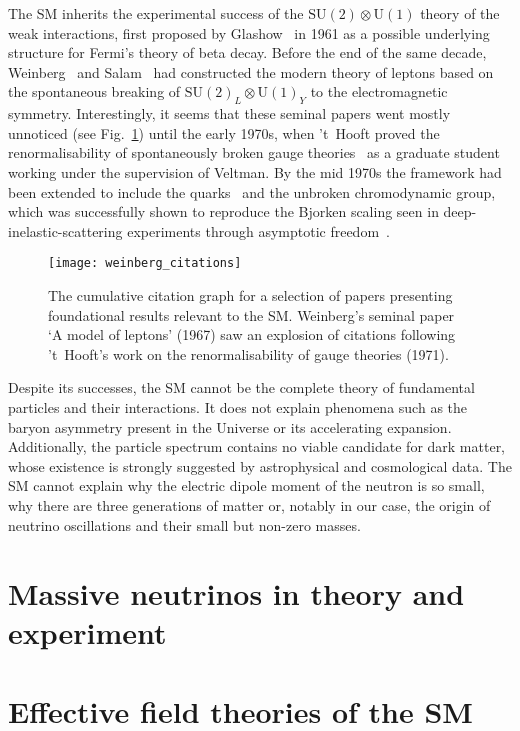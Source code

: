 The SM inherits the experimental success of the
$\mathrm{SU}(2) \otimes \mathrm{U}(1)$ theory of the weak interactions, first
proposed by Glashow~\cite{Glashow:1961tr} in 1961 as a possible underlying
structure for Fermi's theory of beta decay. Before the end of the same decade,
Weinberg~\cite{Weinberg:1967tq} and Salam~\cite{Salam:1968rm} had constructed
the modern theory of leptons based on the spontaneous breaking of
$\mathrm{SU}(2)_{L} \otimes \mathrm{U}(1)_{Y}$ to the electromagnetic symmetry.
Interestingly, it seems that these seminal papers went mostly unnoticed (see
Fig.~\ref{fig:weinberg-citations}) until the early 1970s, when 't~Hooft proved the
renormalisability of spontaneously broken gauge theories~\cite{tHooft:1971akt}
as a graduate student working under the supervision of Veltman. By the mid 1970s
the framework had been extended to include the quarks~\cite{Glashow:1970gm} and
the unbroken chromodynamic group, which was successfully shown to reproduce the
Bjorken scaling seen in deep-inelastic-scattering experiments through asymptotic
freedom~\cite{Gross:1973id}.
\begin{figure}[t]
  \centering
  \texttt{[image: weinberg\_citations]}
  \caption{The cumulative citation graph for a selection of papers presenting
    foundational results relevant to the SM. Weinberg's seminal paper `A model
    of leptons' (1967) saw an explosion of citations following 't~Hooft's work
    on the renormalisability of gauge theories (1971).}
  \label{fig:weinberg-citations}
\end{figure}

Despite its successes, the SM cannot be the complete theory of fundamental
particles and their interactions. It does not explain phenomena such as the
baryon asymmetry present in the Universe or its accelerating expansion.
Additionally, the particle spectrum contains no viable candidate for dark
matter, whose existence is strongly suggested by astrophysical and cosmological
data. The SM cannot explain why the electric dipole moment of the neutron is so
small, why there are three generations of matter or, notably in our case, the
origin of neutrino oscillations and their small but non-zero masses.

\section{Massive neutrinos in theory and experiment}

\lipsum[1]

\section{Effective field theories of the SM}

